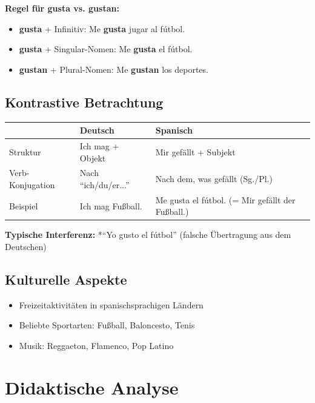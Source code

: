 \documentclass[11pt,a4paper]{article}
\begin{document}
\textbf{Regel für gusta vs. gustan:}
\begin{itemize}
    \item \textbf{gusta} + Infinitiv: Me \textbf{gusta} jugar al fútbol.
    \item \textbf{gusta} + Singular-Nomen: Me \textbf{gusta} el fútbol.
    \item \textbf{gustan} + Plural-Nomen: Me \textbf{gustan} los deportes.
\end{itemize}

\subsection{Kontrastive Betrachtung}

\begin{tabular}{|l|p{5cm}|p{5cm}|}
\hline
& \textbf{Deutsch} & \textbf{Spanisch} \\
\hline
Struktur & Ich mag + Objekt & Mir gefällt + Subjekt \\
\hline
Verb-Konjugation & Nach ``ich/du/er...'' & Nach dem, was gefällt (Sg./Pl.) \\
\hline
Beispiel & Ich mag Fußball. & Me gusta el fútbol. (= Mir gefällt der Fußball.) \\
\hline
\end{tabular}

\textbf{Typische Interferenz:} *``Yo gusto el fútbol'' (falsche Übertragung aus dem Deutschen)

\subsection{Kulturelle Aspekte}
\begin{itemize}
    \item Freizeitaktivitäten in spanischsprachigen Ländern
    \item Beliebte Sportarten: Fußball, Baloncesto, Tenis
    \item Musik: Reggaeton, Flamenco, Pop Latino
\end{itemize}

\section{Didaktische Analyse}
\end{document}
